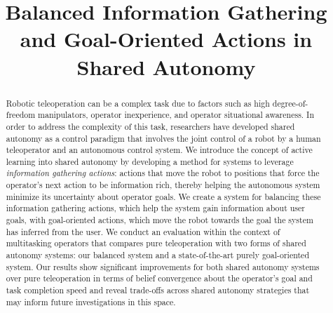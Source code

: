 \documentclass[conference]{IEEEtran}
\begin{document}
\title{Balanced Information Gathering and Goal-Oriented Actions in Shared Autonomy
}


\author{}

\maketitle

\begin{abstract}
Robotic teleoperation can be a complex task due to factors such as high degree-of-freedom manipulators, operator inexperience, and operator situational awareness. In order to address the complexity of this task, researchers have developed shared autonomy as a control paradigm that involves the joint control of a robot by a human teleoperator and an autonomous control system. We introduce the concept of active learning into shared autonomy by developing a method for systems to leverage \textit{information gathering actions}: actions that move the robot to positions that force the operator's next action to be information rich, thereby helping the autonomous system minimize its uncertainty about operator goals. We create a system for balancing these information gathering actions, which help the system gain information about user goals, with goal-oriented actions, which move the robot towards the goal the system has inferred from the user. We conduct an evaluation within the context of multitasking operators that compares pure teleoperation with two forms of shared autonomy systems: our balanced system and a state-of-the-art purely goal-oriented system. Our results show significant improvements for both shared autonomy systems over pure teleoperation in terms of belief convergence about the operator's goal and task completion speed and reveal trade-offs across shared autonomy strategies that may inform future investigations in this space.
\end{abstract}
\end{document}
